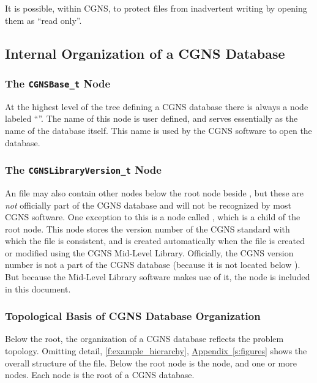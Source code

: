 It is possible, within CGNS, to protect files from inadvertent writing
by opening them as ``read only''.

\subsection{Internal Organization of a CGNS Database}
\label{s:internal}

\subsubsection{The \texttt{CGNSBase\_t} Node}

At the highest level of the tree defining a CGNS database there is
always a node labeled ``''. The name of this
node is user defined, and serves essentially as the name of the
database itself. This name is used by the CGNS software to open the
database.

\subsubsection{The \texttt{CGNSLibraryVersion\_t} Node}

An \HDF file may also contain other nodes below the root node beside
, but these are \emph{not} officially part of the
CGNS database and will not be recognized by most CGNS software.
One exception to this is a node called ,
which is a child of the \HDF root node.
This node stores the version number of the CGNS standard with which
the file is consistent, and is created automatically when the file is
created or modified using the CGNS Mid-Level Library.
Officially, the CGNS version number is not a part of the CGNS
database (because it is not located below ).
But because the Mid-Level Library software makes use of it, the node is
included in this document.

\subsubsection{Topological Basis of CGNS Database Organization}

Below the root, the organization of a CGNS database reflects the problem
topology.
Omitting detail, \autoref{f:example_hierarchy},
\hyperref[s:figures]{Appendix~\ref*{s:figures}} shows the overall
structure of the \HDF file.
Below the \HDF root node is the  node, and
one or more  nodes.
Each  node is the root of a CGNS database.

